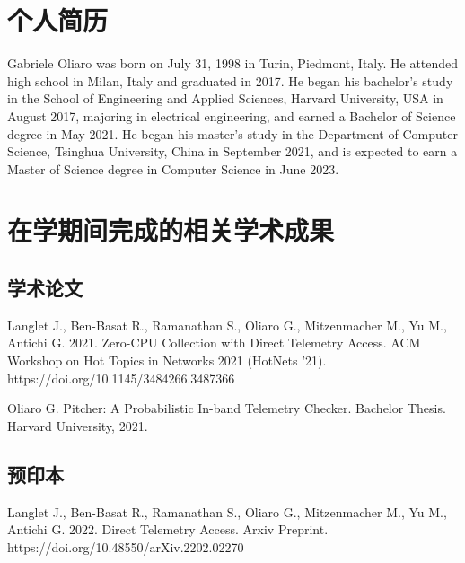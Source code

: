
\begin{resume}

  \section*{个人简历}

  Gabriele Oliaro was born on July 31, 1998 in Turin, Piedmont, Italy. He attended high school in Milan, Italy and graduated in 2017. He began his bachelor’s study in the School of Engineering and Applied Sciences, Harvard University, USA in August 2017, majoring in electrical engineering, and earned a Bachelor of Science degree in May 2021. He began his master’s study in the Department of Computer Science, Tsinghua University, China in September 2021, and is expected to earn a Master of Science degree in Computer Science in June 2023.


  \section*{在学期间完成的相关学术成果}

  \subsection*{学术论文}

  \begin{achievements}
    \item Langlet J., Ben-Basat R., Ramanathan S., Oliaro G., Mitzenmacher M., Yu M., Antichi G. 2021. Zero-CPU Collection with Direct Telemetry Access. ACM Workshop on Hot Topics in Networks 2021 (HotNets '21). https://doi.org/10.1145/3484266.3487366
    \item Oliaro G. Pitcher: A Probabilistic In-band Telemetry Checker. Bachelor Thesis. Harvard University, 2021.
  \end{achievements}


  \subsection*{预印本}

  \begin{achievements}
    \item Langlet J., Ben-Basat R., Ramanathan S., Oliaro G., Mitzenmacher M., Yu M., Antichi G. 2022. Direct Telemetry Access. Arxiv Preprint. https://doi.org/10.48550/arXiv.2202.02270
  \end{achievements}

\end{resume}
